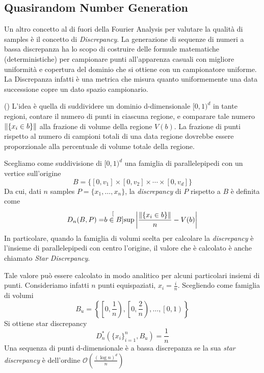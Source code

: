\subsection{Quasirandom Number Generation}
Un altro concetto al di fuori della Fourier Analysis per valutare la qualit\`a di samples \`e il concetto di \textit{Discrepancy}. La generazione di 
sequenze di numeri a bassa discrepanza ha lo scopo di costruire delle formule matematiche (deterministiche) per campionare punti all'apparenza 
casuali con migliore uniformit\`a e copertura del dominio che si ottiene con un campionatore uniforme. La Discrepanza infatti \`e una metrica che 
misura quanto uniformemente una data successione copre un dato spazio campionario.\par
(\cite{pharr}) L'idea \`e quella di suddividere\footnotemark{} un dominio d-dimensionale $[0,1)^d$ in tante regioni, contare il numero di punti in 
ciascuna regione, e comparare tale numero $\norm{\{x_i\in b\}}$ alla frazione di volume della regione $V(b)$. La frazione di punti rispetto al numero 
di campioni totali di una data regione dovrebbe essere proporzionale alla percentuale di volume totale della regione.\par
{}
Scegliamo come suddivisione di $[0,1)^d$ una famiglia di parallelepipedi con un vertice sull'origine
\begin{equation}
	B=\{[0,v_1]\times [0,v_2]\times\cdots\times [0,v_d]\}
\end{equation}
Da cui, dati $n$ samples $P=\{x_1,\ldots,x_n\}$, la \textit{discrepancy} di $P$ rispetto a $B$ \`e definita come
\begin{equation}
	D_n(B,P)=\stackrel[{b\in B}]{}{\operatorname{sup}}\left\vert\frac{\norm{\{x_i\in b\}}}{n}-V(b)\right\vert
\end{equation}
In particolare, quando la famiglia di volumi scelta per calcolare la \textit{discrepancy} \`e l'insieme di parallelepipedi con centro l'origine, 
il valore che \`e calcolato \`e anche chiamato \textit{Star Discrepancy}.\par
Tale valore pu\`o essere calcolato in modo analitico per alcuni particolari insiemi di punti. Consideriamo infatti $n$ punti equispaziati, 
$x_i=\frac{i}{n}$. Scegliendo come famiglia di volumi 
\begin{equation*}
	B_u=\left\{\left[0,\frac{1}{n}\right),\left[0,\frac{2}{n}\right),\ldots,\left[0,1\right)\right\}
\end{equation*}
Si ottiene star discrepancy
\begin{equation}
	D_n^*(\{x_i\}_{i=1}^n,B_u)=\frac{1}{n}
\end{equation}
Una sequenza di punti d-dimensionale \`e a bassa discrepanza se la sua \textit{star discrepancy} \`e dell'ordine 
\mbox{$\mathcal{O}\left(\frac{(\log n)^d}{n}\right)$}
